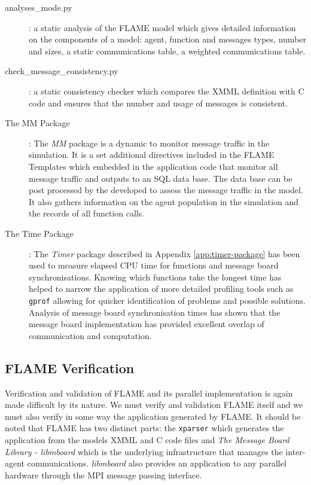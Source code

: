 \begin{description}

	\item [analyses\_mode.py]: a static analysis of the FLAME model which gives detailed information on the components of a model: agent, function and messages types, number and sizes, a static communications table, a weighted communications table.

	\item [check\_message\_consistency.py]: a static consistency checker which compares the XMML definition with C code and ensures that the number and usage of messages is consistent.

	\item [The MM Package]: The \textit{MM} package is a dynamic to monitor message traffic in the simulation. It is a set additional directives included in the FLAME Templates which embedded in the application code that monitor all message traffic and outputs to an SQL data base. The data base can be post processed by the developed to assess the message traffic in the model. It also gathers information on the agent population in the simulation and the records of all function calls.

	\item [The Time Package]: The \textit{Timer} package described in Appendix \ref{app:timer-package} has been used to measure elapsed CPU time for functions and message board synchronisations. Knowing which functions take the longest time has helped to narrow the application of more detailed profiling tools such as \texttt{gprof} allowing for quicker identification of problems and possible solutions. Analysis of message board synchronisation times has shown that the message board implementation has provided excellent overlap of communication and computation.

\end{description}


\subsection {FLAME Verification}

Verification and validation of FLAME and its parallel implementation is again made difficult by its nature. We must verify and validation FLAME itself and we must also verify in some way the application generated by FLAME. It should be noted that FLAME has two distinct parts: the \texttt{xparser} which generates the application from the models XMML and C code files and \textit{The Message Board Library - libmboard} which is the underlying infrastructure that manages the inter-agent communications. \textit{libmboard} also provides an application to any parallel hardware through the MPI message passing interface.


